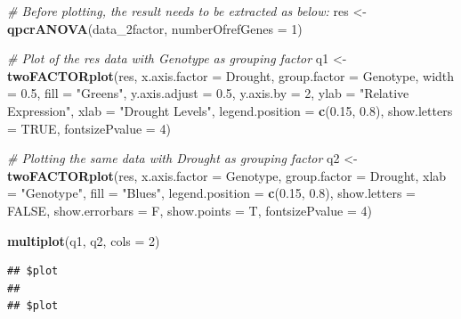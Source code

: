 \documentclass[
]{article}
\newenvironment{Shaded}{\begin{snugshade}}{\end{snugshade}}
\newcommand{\AttributeTok}[1]{\textcolor[rgb]{0.13,0.29,0.53}{#1}}
\newcommand{\CommentTok}[1]{\textcolor[rgb]{0.56,0.35,0.01}{\textit{#1}}}
\newcommand{\ConstantTok}[1]{\textcolor[rgb]{0.56,0.35,0.01}{#1}}
\newcommand{\DecValTok}[1]{\textcolor[rgb]{0.00,0.00,0.81}{#1}}
\newcommand{\FloatTok}[1]{\textcolor[rgb]{0.00,0.00,0.81}{#1}}
\newcommand{\FunctionTok}[1]{\textcolor[rgb]{0.13,0.29,0.53}{\textbf{#1}}}
\newcommand{\NormalTok}[1]{#1}
\newcommand{\OtherTok}[1]{\textcolor[rgb]{0.56,0.35,0.01}{#1}}
\newcommand{\StringTok}[1]{\textcolor[rgb]{0.31,0.60,0.02}{#1}}
\begin{document}
\begin{Shaded}
\begin{Highlighting}[]
\CommentTok{\# Before plotting, the result needs to be extracted as below:}
\NormalTok{res }\OtherTok{\textless{}{-}} \FunctionTok{qpcrANOVA}\NormalTok{(data\_2factor, }\AttributeTok{numberOfrefGenes =} \DecValTok{1}\NormalTok{)}

\CommentTok{\# Plot of the \textquotesingle{}res\textquotesingle{} data with \textquotesingle{}Genotype\textquotesingle{} as grouping factor}
\NormalTok{q1 }\OtherTok{\textless{}{-}} \FunctionTok{twoFACTORplot}\NormalTok{(res,}
   \AttributeTok{x.axis.factor =}\NormalTok{ Drought,}
   \AttributeTok{group.factor =}\NormalTok{ Genotype,}
   \AttributeTok{width =} \FloatTok{0.5}\NormalTok{,}
   \AttributeTok{fill =} \StringTok{"Greens"}\NormalTok{,}
   \AttributeTok{y.axis.adjust =} \FloatTok{0.5}\NormalTok{,}
   \AttributeTok{y.axis.by =} \DecValTok{2}\NormalTok{,}
   \AttributeTok{ylab =} \StringTok{"Relative Expression"}\NormalTok{,}
   \AttributeTok{xlab =} \StringTok{"Drought Levels"}\NormalTok{,}
   \AttributeTok{legend.position =} \FunctionTok{c}\NormalTok{(}\FloatTok{0.15}\NormalTok{, }\FloatTok{0.8}\NormalTok{),}
   \AttributeTok{show.letters =} \ConstantTok{TRUE}\NormalTok{,}
   \AttributeTok{fontsizePvalue =} \DecValTok{4}\NormalTok{)}

\CommentTok{\# Plotting the same data with \textquotesingle{}Drought\textquotesingle{} as grouping factor}
\NormalTok{q2 }\OtherTok{\textless{}{-}} \FunctionTok{twoFACTORplot}\NormalTok{(res,}
   \AttributeTok{x.axis.factor =}\NormalTok{ Genotype,}
   \AttributeTok{group.factor =}\NormalTok{ Drought,}
   \AttributeTok{xlab =} \StringTok{"Genotype"}\NormalTok{,}
   \AttributeTok{fill =} \StringTok{"Blues"}\NormalTok{,}
   \AttributeTok{legend.position =} \FunctionTok{c}\NormalTok{(}\FloatTok{0.15}\NormalTok{, }\FloatTok{0.8}\NormalTok{),}
   \AttributeTok{show.letters =} \ConstantTok{FALSE}\NormalTok{,}
   \AttributeTok{show.errorbars =}\NormalTok{ F,}
   \AttributeTok{show.points =}\NormalTok{ T,}
   \AttributeTok{fontsizePvalue =} \DecValTok{4}\NormalTok{)}

\FunctionTok{multiplot}\NormalTok{(q1, q2, }\AttributeTok{cols =} \DecValTok{2}\NormalTok{)}
\end{Highlighting}
\end{Shaded}

\begin{verbatim}
## $plot
## 
## $plot
\end{verbatim}
\end{document}
